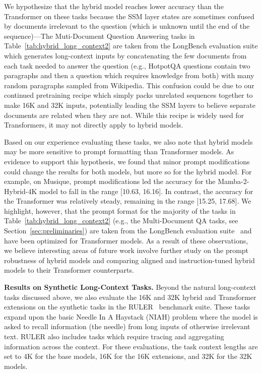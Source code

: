 We hypothesize that the hybrid model reaches lower accuracy than the Transformer on these tasks because the SSM layer states are sometimes confused by documents irrelevant to the question (which is unknown until the end of the sequence)---The Muti-Document Question Answering tasks in Table~\ref{tab:hybrid_long_context2} are taken from the LongBench evaluation suite which generates long-context inputs by concatenating the few documents from each task needed to answer the question (e.g., HotpotQA questions contain two paragraphs and then a question which requires knowledge from both) with many random paragraphs sampled from Wikipedia. This confusion could be due to our continued pretraining recipe which simply packs unrelated sequences together to make 16K and 32K inputs, potentially leading the SSM layers to believe separate documents are related when they are not. While this recipe is widely used for Transformers, it may not directly apply to hybrid models. 

Based on our experience evaluating these tasks, we also note that hybrid models may be more sensitive to prompt formatting than Transformer models. As evidence to support this hypothesis, we found that minor prompt modifications could change the results for both models, but more so for the hybrid model. For example, on Musique, prompt modifications led the accuracy for the Mamba-2-Hybrid-4K model to fall in the range [10.63, 16.16]. In contrast, the accuracy for the Transformer was relatively steady, remaining in the range [15.25, 17.68]. We highlight, however, that the prompt format for the majority of the tasks in Table~\ref{tab:hybrid_long_context2} (e.g., the Multi-Document QA tasks, see Section~\ref{sec:preliminaries}) are taken from the LongBench evaluation suite~\citep{bai2023longbench} and have been optimized for Transformer models. As a result of these observations, we believe interesting areas of future work involve further study on the prompt robustness of hybrid models and comparing aligned and instruction-tuned hybrid models to their Transformer counterparts.

\textbf{Results on Synthetic Long-Context Tasks.} Beyond the natural long-context tasks discussed above, we also evaluate the 16K and 32K hybrid and Transformer extensions on the synthetic tasks in the RULER~\citep{hsieh2024ruler} benchmark suite. These tasks expand upon the basic Needle In A Haystack (NIAH) problem where the model is asked to recall information (the needle) from long inputs of otherwise irrelevant text. RULER also includes tasks which require tracing and aggregating information across the context. For these evaluations, the task context lengths are set to 4K for the base models, 16K for the 16K extensions, and 32K for the 32K models. 

